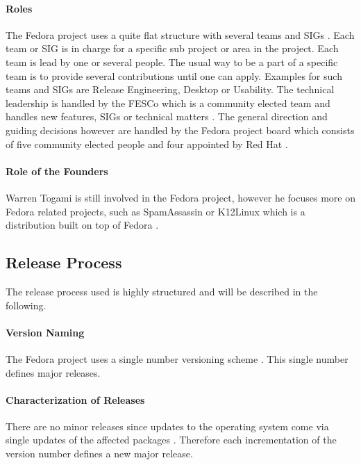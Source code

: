 \paragraph{Roles}

The Fedora project uses a quite flat structure with several teams and \acp{SIG}
\cite{FedoraJoin,FedoraCommunicating,FedoraSIG}. Each team or \ac{SIG} is in
charge for a specific sub project or area in the project. Each team is lead by
one or several people. The usual way to be a part of a specific team is to
provide several contributions until one can apply. Examples for such teams and
\acp{SIG} are Release Engineering, Desktop or Usability. The technical
leadership is handled by the \ac{FESCo} which is a community elected team and
handles new features, \acp{SIG} or technical matters \cite{FedoraFESCo}. The
general direction and guiding decisions however are handled by the Fedora
project board which consists of five community elected people and four
appointed by Red Hat \cite{FedoraBoard}.

\paragraph{Role of the Founders}

Warren Togami is still involved in the Fedora project, however he focuses more
on Fedora related projects, such as SpamAssassin or K12Linux which is a
distribution built on top of Fedora \cite{FedoraTogami}.

\subsection{Release Process}

The release process used is highly structured and will be described in the
following.

\paragraph{Version Naming}

The Fedora project uses a single number versioning scheme
\cite{FedoraHistoricalSchedules,FedoraLifeCycle}. This single number defines
major releases.

\paragraph{Characterization of Releases}

There are no minor releases since updates to the operating system come via
single updates of the affected packages
\cite{FedoraHistoricalSchedules,FedoraLifeCycle}. Therefore each incrementation
of the version number defines a new major release.

